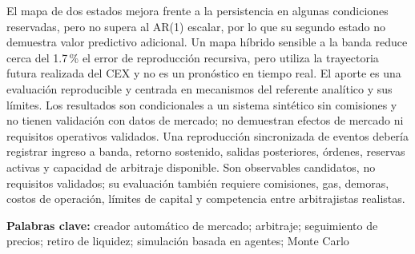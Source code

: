 El mapa de dos estados mejora frente a la persistencia en algunas condiciones reservadas, pero no supera al AR(1) escalar, por lo que su segundo estado no demuestra valor predictivo adicional. Un mapa híbrido sensible a la banda reduce cerca del 1.7\,\% el error de reproducción recursiva, pero utiliza la trayectoria futura realizada del CEX y no es un pronóstico en tiempo real. El aporte es una evaluación reproducible y centrada en mecanismos del referente analítico y sus límites. Los resultados son condicionales a un sistema sintético sin comisiones y no tienen validación con datos de mercado; no demuestran efectos de mercado ni requisitos operativos validados. Una reproducción sincronizada de eventos debería registrar ingreso a banda, retorno sostenido, salidas posteriores, órdenes, reservas activas y capacidad de arbitraje disponible. Son observables candidatos, no requisitos validados; su evaluación también requiere comisiones, gas, demoras, costos de operación, límites de capital y competencia entre arbitrajistas realistas.

\textbf{Palabras clave:} creador automático de mercado; arbitraje; seguimiento de precios; retiro de liquidez; simulación basada en agentes; Monte Carlo
